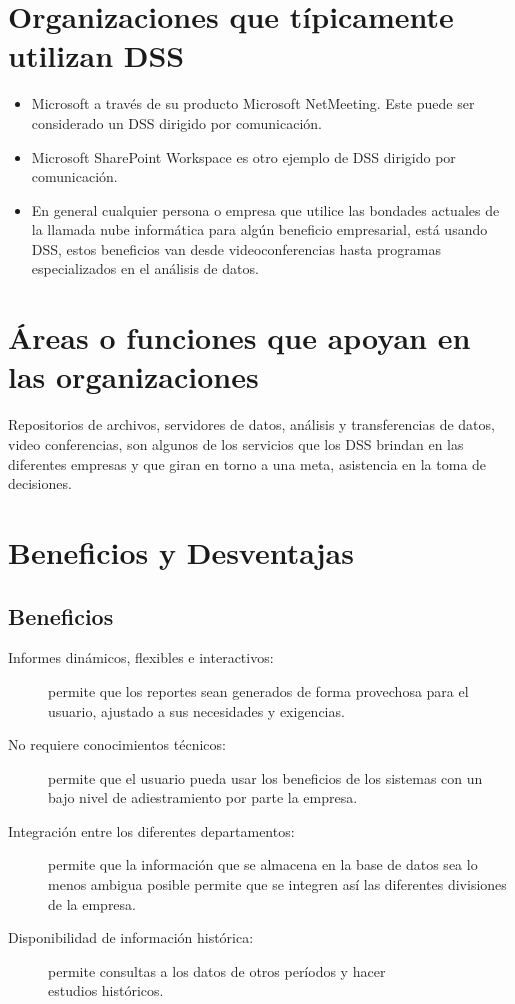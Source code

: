 \section {Organizaciones que típicamente utilizan DSS}
\begin{itemize}
\item Microsoft a través de su producto Microsoft NetMeeting. Este puede ser considerado un DSS dirigido por comunicación.
\item Microsoft SharePoint Workspace es otro ejemplo de DSS dirigido por comunicación.
\item En general cualquier persona o empresa que utilice las bondades actuales  de la llamada nube informática para algún beneficio empresarial, está  usando DSS, estos beneficios van desde videoconferencias hasta programas especializados en el análisis de datos.
\end{itemize}

\section {Áreas o funciones que apoyan en las organizaciones}
Repositorios de archivos, servidores de datos, análisis y transferencias de datos, video conferencias, son algunos de los servicios que los DSS brindan en las diferentes empresas y que giran en torno a una meta, asistencia en la toma de decisiones.

\section {Beneficios y Desventajas}

\subsection{Beneficios}
\begin{description}
\item [Informes dinámicos, flexibles e interactivos:] permite que los reportes sean generados de forma provechosa para el usuario, ajustado a sus necesidades y exigencias.
\item [No requiere conocimientos técnicos:] permite que el usuario pueda usar los beneficios de los sistemas con un bajo nivel de adiestramiento por parte la empresa.
\item [Integración entre los diferentes departamentos:] permite que la información que se almacena en la base de datos sea lo menos ambigua posible permite que se integren así las diferentes divisiones de la empresa.
\item [Disponibilidad de información histórica:] permite consultas a los datos de otros períodos y hacer\\ estudios históricos.
\end{description}

